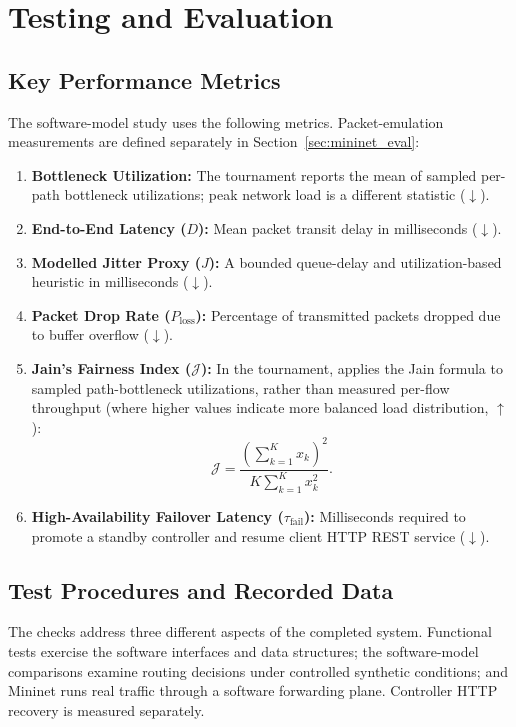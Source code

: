 \documentclass[12pt,a4paper,oneside]{report}
\newcommand{\lowerbetter}{\ensuremath{\downarrow}}
\newcommand{\higherbetter}{\ensuremath{\uparrow}}
\let\cite\citep
\begin{document}
\section{Testing and Evaluation}
\label{sec:testing}

\subsection{Key Performance Metrics}
The software-model study uses the following metrics. Packet-emulation measurements are defined separately in Section~\ref{sec:mininet_eval}:
\begin{enumerate}
    \item \textbf{Bottleneck Utilization:} The tournament reports the mean of sampled per-path bottleneck utilizations; peak network load is a different statistic (\lowerbetter).
    \item \textbf{End-to-End Latency ($D$):} Mean packet transit delay in milliseconds (\lowerbetter).
    \item \textbf{Modelled Jitter Proxy ($J$):} A bounded queue-delay and utilization-based heuristic in milliseconds (\lowerbetter).
    \item \textbf{Packet Drop Rate ($P_{\text{loss}}$):} Percentage of transmitted packets dropped due to buffer overflow (\lowerbetter).
    \item \textbf{Jain's Fairness Index ($\mathcal{J}$):} In the tournament, applies the Jain formula to sampled path-bottleneck utilizations, rather than measured per-flow throughput \cite{jain1984quantitative} (where higher values indicate more balanced load distribution, $\higherbetter$):
    \begin{equation}
    \label{eq:jains_fairness_metric}
    \mathcal{J} = \frac{\left( \sum_{k=1}^K x_k \right)^2}{K \sum_{k=1}^K x_k^2}.
    \end{equation}
    \item \textbf{High-Availability Failover Latency ($\tau_{\text{fail}}$):} Milliseconds required to promote a standby controller and resume client HTTP REST service (\lowerbetter).
\end{enumerate}

\subsection{Test Procedures and Recorded Data}
The checks address three different aspects of the completed system. Functional tests exercise the software interfaces and data structures; the software-model comparisons examine routing decisions under controlled synthetic conditions; and Mininet runs real traffic through a software forwarding plane. Controller HTTP recovery is measured separately.
\end{document}
